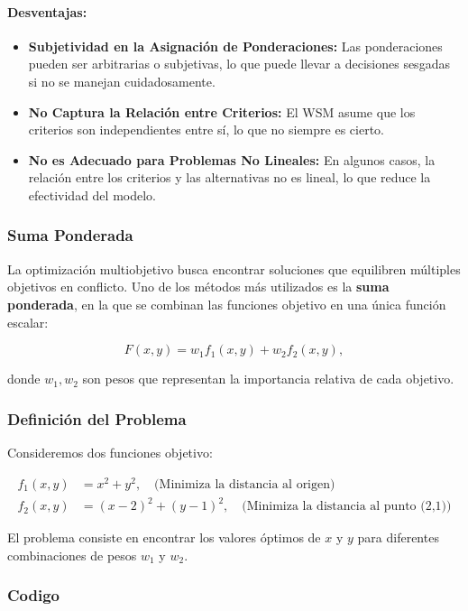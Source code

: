 \documentclass[12pt]{article}
\begin{document}
\paragraph{Desventajas:}
\begin{itemize}
    \item \textbf{Subjetividad en la Asignación de Ponderaciones:} Las ponderaciones pueden ser arbitrarias o subjetivas, lo que puede llevar a decisiones sesgadas si no se manejan cuidadosamente.
    \item \textbf{No Captura la Relación entre Criterios:} El WSM asume que los criterios son independientes entre sí, lo que no siempre es cierto.
    \item \textbf{No es Adecuado para Problemas No Lineales:} En algunos casos, la relación entre los criterios y las alternativas no es lineal, lo que reduce la efectividad del modelo.
\end{itemize}

\subsubsection*{Suma Ponderada}
La optimización multiobjetivo busca encontrar soluciones que equilibren múltiples objetivos en conflicto. Uno de los métodos más utilizados es la \textbf{suma ponderada}, en la que se combinan las funciones objetivo en una única función escalar:

\begin{equation}
F(x, y) = w_1 f_1(x, y) + w_2 f_2(x, y),
\end{equation}

donde \( w_1, w_2 \) son pesos que representan la importancia relativa de cada objetivo.

\subsubsection*{Definición del Problema}
Consideremos dos funciones objetivo:

\begin{align}
f_1(x, y) &= x^2 + y^2,  \quad \text{(Minimiza la distancia al origen)} \\
f_2(x, y) &= (x - 2)^2 + (y - 1)^2, \quad \text{(Minimiza la distancia al punto (2,1))}
\end{align}

El problema consiste en encontrar los valores óptimos de \( x \) y \( y \) para diferentes combinaciones de pesos \( w_1 \) y \( w_2 \).
\subsubsection*{Codigo}
\end{document}

